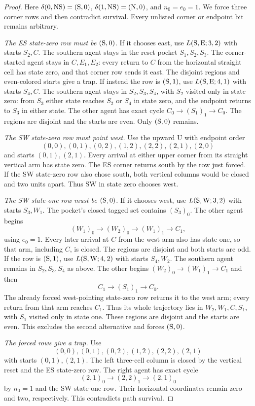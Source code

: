\begin{proof}
Here
$\delta(0,\mathrm{NS})=(\mathrm{S},0)$,
$\delta(1,\mathrm{NS})=(\mathrm{N},0)$, and $n_0=e_0=1$.
We force three corner rows and then contradict survival. Every
unlisted corner or endpoint bit remains arbitrary.

\emph{The ES state-zero row must be $(\mathrm{S},0)$.}
If it chooses east, use $L(\mathrm{S},\mathrm{E};3,2)$ with starts $S_2,C$.
The southern agent stays in the reset pocket $S_1,S_2,S_3$.
The corner-started agent stays in $C,E_1,E_2$: every return to $C$
from the horizontal straight cell has state zero, and that corner
row sends it east. The disjoint regions and even-colored starts
give a trap.
If instead the row is $(\mathrm{S},1)$, use $L(\mathrm{S},\mathrm{E};4,1)$
with starts $S_4,C$. The southern agent stays in $S_2,S_3,S_4$,
with $S_2$ visited only in state zero: from $S_3$ either state
reaches $S_2$ or $S_4$ in state zero, and the endpoint returns
to $S_3$ in either state. The other agent has exact cycle
$C_0\to(S_1)_1\to C_0$. The regions are disjoint and the starts
are even. Only $(\mathrm{S},0)$ remains.

\emph{The SW state-zero row must point west.}
Use the upward U with endpoint order
\[
(0,0),(0,1),(0,2),(1,2),(2,2),(2,1),(2,0)
\]
and starts $(0,1),(2,1)$. Every arrival at either upper corner
from its straight vertical arm has state zero. The ES corner
returns south by the row just forced. If the SW state-zero row
also chose south, both vertical columns would be closed and
two units apart. Thus SW in state zero chooses west.

\emph{The SW state-one row must be $(\mathrm{S},0)$.}
If it chooses west, use $L(\mathrm{S},\mathrm{W};3,2)$ with starts $S_3,W_1$.
The pocket's closed tagged set contains $(S_3)_0$.
The other agent begins
\[
(W_1)_0\to(W_2)_0\to(W_1)_1\to C_1,
\]
using $e_0=1$. Every later arrival at $C$ from the west arm also
has state one, so that arm, including $C$, is closed. The regions
are disjoint and both starts are odd.
If the row is $(\mathrm{S},1)$, use $L(\mathrm{S},\mathrm{W};4,2)$ with starts
$S_4,W_2$. The southern agent remains in $S_2,S_3,S_4$ as above.
The other begins $(W_2)_0\to(W_1)_1\to C_1$ and then
\[
C_1\to(S_1)_1\to C_0.
\]
The already forced west-pointing state-zero row returns it to the
west arm; every return from that arm reaches $C_1$.
Thus its whole trajectory lies in $W_2,W_1,C,S_1$, with $S_1$
visited only in state one. These regions are disjoint and the
starts are even. This excludes the second alternative and forces
$(\mathrm{S},0)$.

\emph{The forced rows give a trap.}
Use
\[
(0,0),(0,1),(0,2),(1,2),(2,2),(2,1)
\]
with starts $(0,1),(2,1)$. The left three-cell column is closed
by the vertical reset and the ES state-zero row. The right agent
has exact cycle
\[
(2,1)_0\to(2,2)_1\to(2,1)_0
\]
by $n_0=1$ and the SW state-one row. Their horizontal coordinates
remain zero and two, respectively. This contradicts path survival.
\end{proof}

